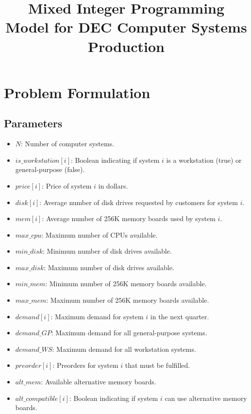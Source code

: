 \documentclass{article}
\begin{document}
\title{Mixed Integer Programming Model for DEC Computer Systems Production}
\author{}
\date{}
\maketitle

\section*{Problem Formulation}

\subsection*{Parameters}
\begin{itemize}
    \item $N$: Number of computer systems.
    \item $is\_workstation[i]$: Boolean indicating if system $i$ is a workstation (true) or general-purpose (false).
    \item $price[i]$: Price of system $i$ in dollars.
    \item $disk[i]$: Average number of disk drives requested by customers for system $i$.
    \item $mem[i]$: Average number of 256K memory boards used by system $i$.
    \item $max\_cpu$: Maximum number of CPUs available.
    \item $min\_disk$: Minimum number of disk drives available.
    \item $max\_disk$: Maximum number of disk drives available.
    \item $min\_mem$: Minimum number of 256K memory boards available.
    \item $max\_mem$: Maximum number of 256K memory boards available.
    \item $demand[i]$: Maximum demand for system $i$ in the next quarter.
    \item $demand\_GP$: Maximum demand for all general-purpose systems.
    \item $demand\_WS$: Maximum demand for all workstation systems.
    \item $preorder[i]$: Preorders for system $i$ that must be fulfilled.
    \item $alt\_mem$: Available alternative memory boards.
    \item $alt\_compatible[i]$: Boolean indicating if system $i$ can use alternative memory boards.
\end{itemize}
\end{document}
